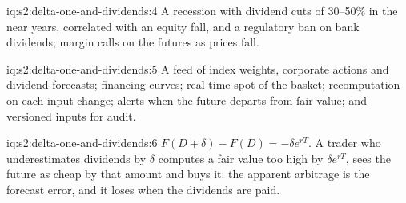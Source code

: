 \begin{solution}{iq:s2:delta-one-and-dividends:4}
A recession with dividend cuts of 30--50\% in the near years, correlated with an equity fall, and a regulatory ban on bank dividends; margin calls on
the futures as prices fall.
\end{solution}

\begin{solution}{iq:s2:delta-one-and-dividends:5}
A feed of index weights, corporate actions and dividend forecasts; financing curves; real-time spot of the basket; recomputation on each input change;
alerts when the future departs from fair value; and versioned inputs for audit.
\end{solution}

\begin{solution}{iq:s2:delta-one-and-dividends:6}
$F(D + \delta) - F(D) = -\delta e^{rT}$. A trader who underestimates dividends by $\delta$ computes a fair value too high by $\delta e^{rT}$, sees the
future as cheap by that amount and buys it: the apparent arbitrage is the forecast error, and it loses when the dividends are paid.
\end{solution}

